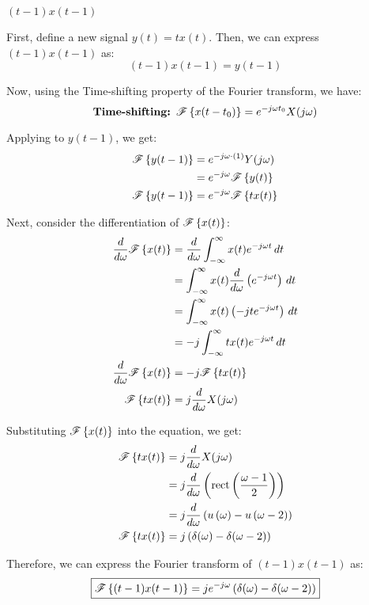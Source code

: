 \documentclass[a4paper, 10pt]{article}
\begin{document}
\newpage

\begin{tosubmit}
\begin{subproblems}[start=2]
    \item \( (t-1)x(t-1) \)
\end{subproblems}

\par\noindent\submitsolution
First, define a new signal \( y(t) = tx(t) \). Then, we can express \( (t-1)x(t-1) \) as:
\[
    (t-1)x(t-1) = y(t-1)
\]

Now, using the Time-shifting property of the Fourier transform, we have:
\[
    \textbf{Time-shifting: } \mathscr{F} \left\{ x(t - t_0) \right\} = e^{-j\omega t_0} X(j\omega)
\]

Applying to \( y(t-1) \), we get:
\begin{align*}  
    \mathscr{F} \left\{ y(t-1) \right\} &= e^{-j\omega \cdot (1)} Y(j\omega) \\
    &= e^{-j\omega} \mathscr{F} \left\{ y(t) \right\} \\
    \mathscr{F} \left\{ y(t-1) \right\} &= e^{-j\omega} \mathscr{F} \left\{ tx(t) \right\}
\end{align*}

Next, consider the differentiation of \( \mathscr{F} \left\{ x(t) \right\} \):
\begin{align*}
    \frac{d}{d\omega} \mathscr{F} \left\{ x(t) \right\} &= \frac{d}{d\omega} \int_{-\infty}^{\infty} x(t) e^{-j\omega t} \,dt \\
    &= \int_{-\infty}^{\infty} x(t) \frac{d}{d\omega} \left( e^{-j\omega t} \right) \,dt \\
    &= \int_{-\infty}^{\infty} x(t) \left( -jt e^{-j\omega t} \right) \,dt \\
    &= -j \int_{-\infty}^{\infty} t x(t) e^{-j\omega t} \,dt \\
    \frac{d}{d\omega} \mathscr{F} \left\{ x(t) \right\}  &= -j \mathscr{F} \left\{ t x(t) \right\} \\
    \mathscr{F} \left\{ t x(t) \right\}  &= j \frac{d}{d\omega} X(j\omega)
\end{align*}

Substituting \( \mathscr{F} \left\{ x(t) \right\} \) into the equation, we get:
\begin{align*}  
    \mathscr{F} \left\{ tx(t) \right\} &= j \frac{d}{d\omega} X(j\omega) \\
    &= j \frac{d}{d\omega} \left( \textrm{rect} \left( \frac{\omega - 1}{2} \right) \right) \\
    &= j \frac{d}{d\omega} \left( u\left( \omega \right) - u\left( \omega - 2 \right) \right) \\
    \mathscr{F} \left\{ tx(t) \right\} &= j \left( \delta(\omega) - \delta(\omega - 2) \right)
\end{align*}

Therefore, we can express the Fourier transform of \( (t-1)x(t-1) \) as:
\[ \boxed{
    \mathscr{F} \left\{ (t-1)x(t-1) \right\} = j e^{-j\omega} \left( \delta(\omega) - \delta(\omega - 2) \right)
} \]
\end{tosubmit}
\end{document}
